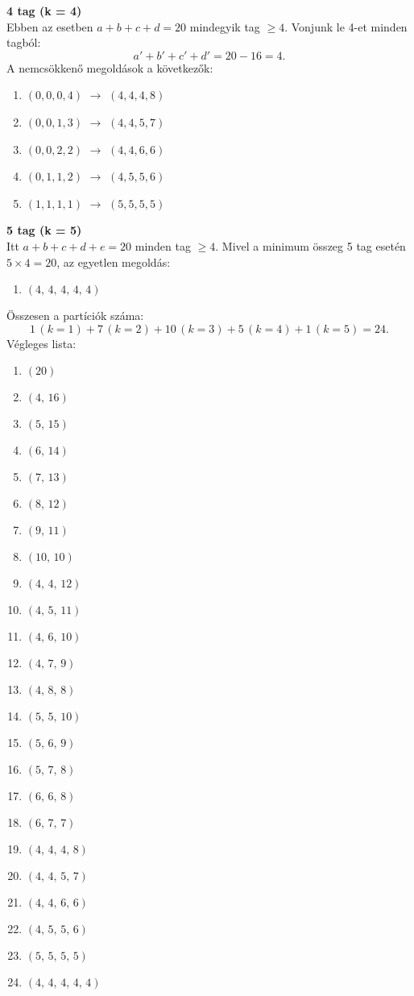 \begin{solution}
\textbf{4 tag (k = 4)}\\
 Ebben az esetben $a+b+c+d=20$ mindegyik tag $\ge4$. Vonjunk le
4-et minden tagból: 
\[
a'+b'+c'+d'=20-16=4.
\]
A nemcsökkenő megoldások a következők: 
\begin{enumerate}
[label=(\alph*)]
\item $(0,0,0,4)$ $\to$ $(4,4,4,8)$ 
\item $(0,0,1,3)$ $\to$ $(4,4,5,7)$ 
\item $(0,0,2,2)$ $\to$ $(4,4,6,6)$ 
\item $(0,1,1,2)$ $\to$ $(4,5,5,6)$ 
\item $(1,1,1,1)$ $\to$ $(5,5,5,5)$ 
\end{enumerate}
\textbf{5 tag (k = 5)}\\
 Itt $a+b+c+d+e=20$ minden tag $\ge4$. Mivel a minimum összeg 5
tag esetén $5\times4=20$, az egyetlen megoldás: 
\begin{enumerate}
\item $(4,\,4,\,4,\,4,\,4)$ 
\end{enumerate}
Összesen a partíciók száma: 
\[
1\,(k=1)+7\,(k=2)+10\,(k=3)+5\,(k=4)+1\,(k=5)=24.
\]
Végleges lista: 
\begin{enumerate}
[label=(\alph*)]
\item $(20)$ 
\item $(4,\,16)$ 
\item $(5,\,15)$ 
\item $(6,\,14)$ 
\item $(7,\,13)$ 
\item $(8,\,12)$ 
\item $(9,\,11)$ 
\item $(10,\,10)$ 
\item $(4,\,4,\,12)$ 
\item $(4,\,5,\,11)$ 
\item $(4,\,6,\,10)$ 
\item $(4,\,7,\,9)$ 
\item $(4,\,8,\,8)$ 
\item $(5,\,5,\,10)$ 
\item $(5,\,6,\,9)$ 
\item $(5,\,7,\,8)$ 
\item $(6,\,6,\,8)$ 
\item $(6,\,7,\,7)$ 
\item $(4,\,4,\,4,\,8)$ 
\item $(4,\,4,\,5,\,7)$ 
\item $(4,\,4,\,6,\,6)$ 
\item $(4,\,5,\,5,\,6)$ 
\item $(5,\,5,\,5,\,5)$ 
\item $(4,\,4,\,4,\,4,\,4)$ 
\end{enumerate}
\end{solution}
